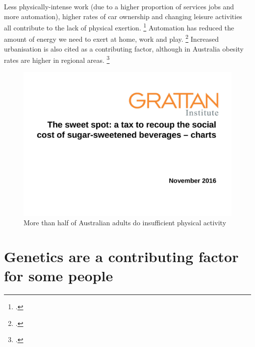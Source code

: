 \documentclass[embargoed]{grattan}
\begin{document}
Less physically-intense work (due to a higher proportion of services jobs and more automation), higher rates of car ownership and changing leisure activities all contribute to the lack of physical exertion. \footcites{Popkin2004nutritiontransitionworldwide}{Finkelstein2010EconomicsObesity}{Popkin1998obesityepidemicis}{Drewnowski1997nutritiontransitionnew} Automation has reduced the amount of energy we need to exert at home, work and play.%
\footcites{Caballero2007globalepidemicobesity}{Popkin2004nutritiontransitionworldwide} Increased urbanisation is also cited as a contributing factor, although in Australia obesity rates are higher in regional areas.%
\footcites{Popkin1998obesityepidemicis}{Drewnowski1997nutritiontransitionnew}



\begin{figure}
\caption{More than half of Australian adults do insufficient physical activity}\label{fig:More-than-half-Aust-adults-insufficient-physical-activity}

\includegraphics[page=5]{atlas/ObesityCharts}


\end{figure}

\section{Genetics are a contributing factor for some people}\label{genetics-are-a-contributing-factor-for-some-people}
\end{document}
